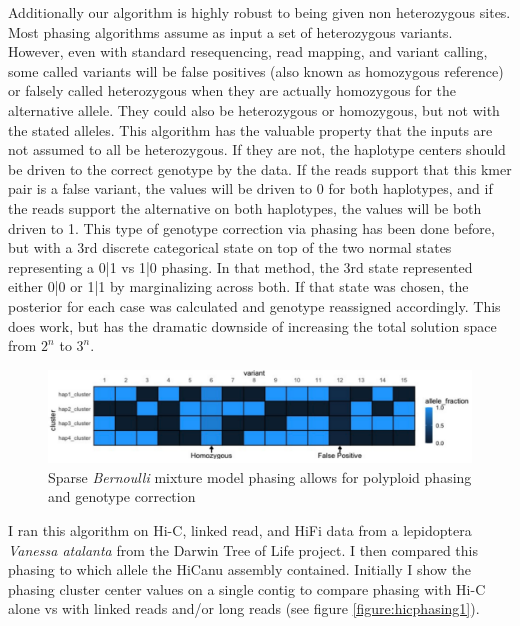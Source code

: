 \par{
Additionally our algorithm is highly robust to being given non heterozygous sites. Most phasing algorithms assume as input a set of heterozygous variants. However, even with standard resequencing, read mapping, and variant calling, some called variants will be false positives (also known as homozygous reference) or falsely called heterozygous when they are actually homozygous for the alternative allele. They could also be heterozygous or homozygous, but not with the stated alleles. This algorithm has the valuable property that the inputs are not assumed to all be heterozygous. If they are not, the haplotype centers should be driven to the correct genotype by the data. If the reads support that this kmer pair is a false variant, the values will be driven to 0 for both haplotypes, and if the reads support the alternative on both haplotypes, the values will be both driven to 1. This type of genotype correction via phasing has been done before, but with a 3rd discrete categorical state on top of the two normal states representing a 0|1 vs 1|0 phasing\cite{mypatent}. In that method, the 3rd state represented either 0|0 or 1|1 by marginalizing across both. If that state was chosen, the posterior for each case was calculated and genotype reassigned accordingly. This does work, but has the dramatic downside of increasing the total solution space from $2^n$ to $3^n$.
} 


\begin{figure}[htbp!]
\caption{Sparse \textit{Bernoulli} mixture model phasing allows for polyploid phasing and genotype correction}
\label{figure:bernoulli}
\begin{centering}
\includegraphics[width=\textwidth]{poly.png}
\end{centering}
\end{figure}


\par{
I ran this algorithm on Hi-C, linked read, and HiFi data from a lepidoptera \textit{Vanessa atalanta} from the Darwin Tree of Life project. I then compared this phasing to which allele the HiCanu assembly 
contained. Initially I show the phasing cluster center values on a single contig to compare phasing with Hi-C alone vs with linked reads and/or long reads (see figure \ref{figure:hicphasing1}).
}

